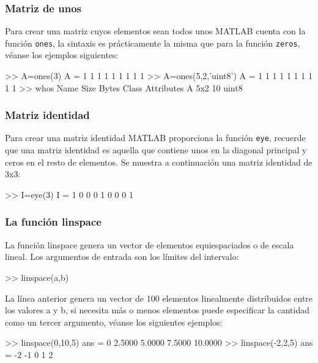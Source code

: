 \subsubsection{Matriz de unos}\label{matriz-de-unos}

Para crear una matriz cuyos elementos sean todos unos MATLAB cuenta con
la función \texttt{ones}, la sintaxis es prácticamente la misma que para
la función \texttt{zeros}, véanse los ejemplos siguientes:

\begin{matlab}
>> A=ones(3)
A =
     1     1     1
     1     1     1
     1     1     1
>> A=ones(5,2,'uint8')
A =
    1    1
    1    1
    1    1
    1    1
    1    1
>> whos
  Name      Size            Bytes  Class    Attributes
  A         5x2                10  uint8      
\end{matlab}

\subsubsection{Matriz identidad}\label{matriz-identidad}

Para crear una matriz identidad MATLAB proporciona la función
\texttt{eye}, recuerde que una matriz identidad es aquella que contiene
unos en la diagonal principal y ceros en el resto de elementos. Se
muestra a continuación una matriz identidad de 3x3:

\begin{matlab}
>> I=eye(3)
I =
     1     0     0
     0     1     0
     0     0     1
\end{matlab}

\subsubsection{La función linspace}\label{la-funcion-linspace}

La función linspace genera un vector de elementos equiespaciados o de
escala lineal. Los argumentos de entrada son los límites del intervalo:

\begin{matlab}
>> linspace(a,b)
\end{matlab}

La línea anterior genera un vector de 100 elementos linealmente
distribuidos entre los valores a y b, si necesita más o menos elementos
puede especificar la cantidad como un tercer argumento, véanse los
siguientes ejemplos:

\begin{matlab}
>> linspace(0,10,5)
ans =
         0    2.5000    5.0000    7.5000   10.0000
>> linspace(-2,2,5)
ans =
    -2    -1     0     1     2
\end{matlab}


